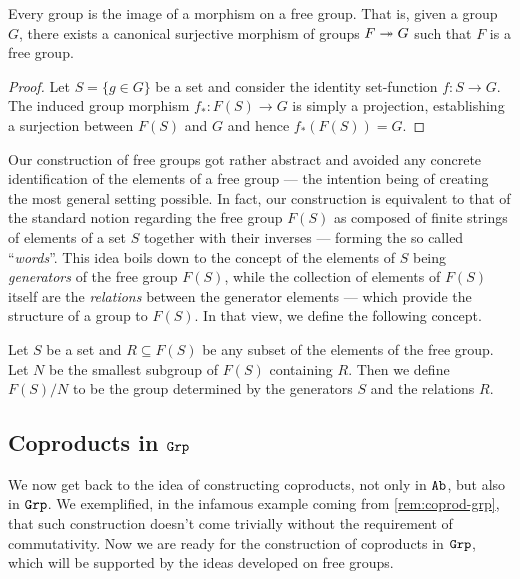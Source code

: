 \begin{proposition}
    \label{prop:free-group-factorization}
    Every group is the image of a morphism on a free group. That is, given a group
    \(G\), there exists a canonical surjective morphism of groups \(F \twoheadrightarrow G\)
    such that \(F\) is a free group.
\end{proposition}

\begin{proof}
    Let \(S = \{g \in G\}\) be a set and consider the identity set-function \(f: S \to
    G\). The induced group morphism \(f_{*}: F(S) \to G\) is simply a projection,
    establishing a surjection between \(F(S)\) and \(G\) and hence \(f_{*}(F(S)) =
    G\).
\end{proof}

Our construction of free groups got rather abstract and avoided any concrete
identification of the elements of a free group --- the intention being of
creating the most general setting possible. In fact, our construction is
equivalent to that of the standard notion regarding the free group \(F(S)\) as
composed of finite strings of elements of a set \(S\) together with their
inverses --- forming the so called ``\emph{words}''. This idea boils down to the
concept of the elements of \(S\) being \emph{generators} of the free group
\(F(S)\), while the collection of elements of \(F(S)\) itself are the
\emph{relations} between the generator elements --- which provide the structure
of a group to \(F(S)\). In that view, we define the following concept.

\begin{definition}
    \label{def:grp-determined-generators-relations}
    Let \(S\) be a set and \(R \subseteq F(S)\) be any subset of the elements of the
    free group. Let \(N\) be the smallest subgroup of \(F(S)\) containing
    \(R\). Then we define \(F(S)/N\) to be the group determined by the generators
    \(S\) and the relations \(R\).
\end{definition}

\subsection{Coproducts in \texorpdfstring{\({\texttt{Grp}}\)}{Grp}}

We now get back to the idea of constructing coproducts, not only in \({\texttt{Ab}}\), but
also in \({\texttt{Grp}}\). We exemplified, in the infamous example coming from
\cref{rem:coprod-grp}, that such construction doesn't come trivially without
the requirement of commutativity. Now we are ready for the construction of
coproducts in \({\texttt{Grp}}\), which will be supported by the ideas developed on free
groups.

